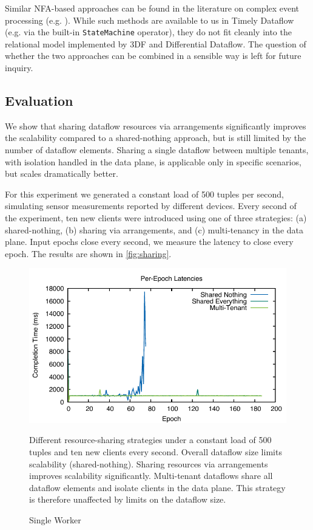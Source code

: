 \documentclass[../catalog.tex]{subfiles}
\begin{document}
Similar NFA-based approaches can be found in the literature on complex
event processing (e.g. \cite{agrawal2008}). While such methods are
available to us in Timely Dataflow (e.g. via the built-in
\texttt{StateMachine} operator), they do not fit cleanly into the
relational model implemented by 3DF and Differential Dataflow. The
question of whether the two approaches can be combined in a sensible
way is left for future inquiry.

\subsection{Evaluation}

We show that sharing dataflow resources via arrangements significantly
improves the scalability compared to a shared-nothing approach, but is
still limited by the number of dataflow elements. Sharing a single
dataflow between multiple tenants, with isolation handled in the data
plane, is applicable only in specific scenarios, but scales
dramatically better.

For this experiment we generated a constant load of 500 tuples per
second, simulating sensor measurements reported by different
devices. Every second of the experiment, ten new clients were
introduced using one of three strategies: (a) shared-nothing, (b)
sharing via arrangements, and (c) multi-tenancy in the data plane.
Input epochs close every second, we measure the latency to close every epoch.
The results are shown in \autoref{fig:sharing}.

\begin{figure}[h!]
  \includegraphics[width=1.0\linewidth]{results/multitenant_w1_p1/times}
  \caption{Single Worker}
  \label{fig:sharing}
  \medskip
  \small

  Different resource-sharing strategies under a constant load of 500
  tuples and ten new clients every second. Overall dataflow size
  limits scalability (shared-nothing). Sharing resources via
  arrangements improves scalability significantly. Multi-tenant
  dataflows share all dataflow elements and isolate clients in the
  data plane. This strategy is therefore unaffected by limits on the
  dataflow size.
\end{figure}
\end{document}
